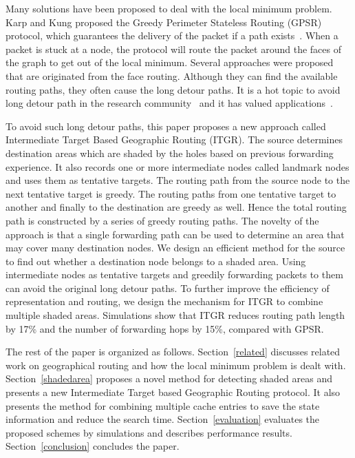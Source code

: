 \documentclass[3p,times]{elsarticle}
\begin{document}
Many solutions have been proposed to deal with the local minimum problem.
Karp and Kung proposed the Greedy Perimeter Stateless
Routing (GPSR) protocol, which guarantees the delivery of the packet if a path exists~\cite{ex13}.
When a packet is stuck at a node, the protocol will route the packet around the faces of the graph
to get out of the local minimum. Several approaches were proposed
that are originated from the face routing. Although they can find the
available routing paths, they often cause the long detour paths. It is a hot topic
to avoid long detour path in the research community~\cite{ITGR,YangHDAR} and it has valued applications~\cite{vehicle1}.

To avoid such long detour paths, this paper proposes
a new approach called Intermediate Target Based Geographic Routing (ITGR).
The source
determines destination areas which are shaded by the holes based on
previous forwarding experience.
It also records one or more intermediate nodes called landmark nodes and
uses them as tentative targets. The routing path from the source node to the
next tentative target is greedy.
The routing paths from one tentative target to another and finally to the destination
are greedy as well. Hence the total routing path is constructed by a series of greedy routing paths.
The novelty of the approach is that
a single forwarding path can be used to determine an area that may cover many
destination nodes.
We design an efficient method for the source to find out whether a destination node belongs to
a shaded area.
Using
intermediate nodes as tentative targets and greedily forwarding packets to them can
avoid the original long detour paths.
To further improve the efficiency of representation and routing, we
design the mechanism for ITGR to combine multiple shaded areas.
Simulations show that ITGR reduces routing path length by 17\%  and
the number of forwarding hops by 15\%, compared with GPSR.

The rest of the paper is organized as follows.
Section~\ref{related} discusses related work on geographical routing and how the
local minimum problem is dealt with.
Section~\ref{shadedarea} proposes a novel method for detecting shaded areas and
presents a new Intermediate Target based Geographic Routing protocol.
It also presents the method for combining multiple cache entries to
save the state information and reduce the search time.
Section~\ref{evaluation}
evaluates the proposed schemes by simulations and describes performance results.
Section~\ref{conclusion} concludes the paper.
\end{document}
